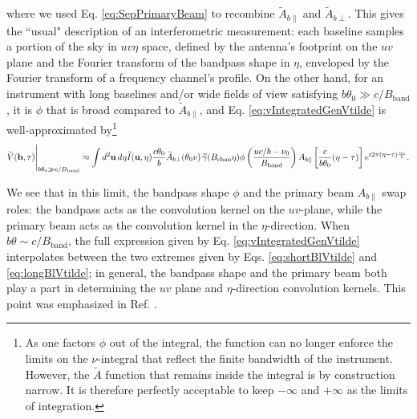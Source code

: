\documentclass[twocolumn,aps,prd,nofootinbib,showpacs]{revtex4-1}
\begin{document}
\begin{widetext}
\begin{equation}
\end{equation}
where we used  Eq. \eqref{eq:SepPrimaryBeam} to recombine $\widetilde{A}_{b\parallel}$ and $\widetilde{A}_{b\perp}$.  This gives the ``usual" description of an interferometric measurement: each baseline samples a portion of the sky in $uv\eta$ space, defined by the antenna's footprint on the $uv$ plane and the Fourier transform of the bandpass shape in $\eta$, enveloped by the Fourier transform of a frequency channel's profile.  On the other hand, for an instrument with long baselines and/or wide fields of view satisfying $b\theta_0 \gg c/B_\textrm{band} $, it is $\phi$ that is broad compared to $\widetilde{A}_{b\parallel}$, and  Eq. \eqref{eq:vIntegratedGenVtilde} is well-approximated by\footnote{As one factors $\phi$ out of the integral, the function can no longer enforce the limits on the $\nu$-integral that reflect the finite bandwidth of the instrument.  However, the $\widetilde{A}$ function that remains inside the integral is by construction narrow.  It is therefore perfectly acceptable to keep $-\infty$ and $+\infty$ as the limits of integration.}
\begin{equation}
\label{eq:longBlVtilde}
\widetilde{V} (\mathbf{b}, \tau) \Bigg{|}_{b\theta_0 \gg c/B_\textrm{band}} \approx \int d^2\mathbf{u} \, d\eta \widetilde{I} (\mathbf{u}, \eta) \frac{c \theta_0}{b} \widetilde{A}_{b\perp} (\theta_0 v) \,\widetilde{\gamma}(B_\textrm{chan} \eta)  \phi \left( \frac{uc/b - \nu_0}{B_\textrm{band}} \right) A_{b\parallel} \left[ \frac{c}{b \theta_0} ( \eta - \tau ) \right] e^{i 2\pi (\eta - \tau) \frac{uc}{b} }.
\end{equation}
\end{widetext}
We see that in this limit, the bandpass shape $\phi$ and the primary beam $A_{b\parallel}$ swap roles: the bandpass acts as the convolution kernel on the $uv$-plane, while the primary beam acts as the convolution kernel in the $\eta$-direction.  When $b\theta \sim c / B_\textrm{band}$, the full expression given by  Eq. \eqref{eq:vIntegratedGenVtilde} interpolates between the two extremes given by  Eqs. \eqref{eq:shortBlVtilde} and \eqref{eq:longBlVtilde}; in general, the bandpass shape and the primary beam both play a part in determining the $uv$ plane and $\eta$-direction convolution kernels.  This point was emphasized in Ref. \cite{Parsons2012b}.
\end{document}
